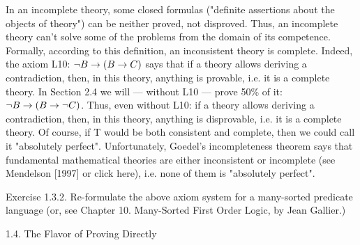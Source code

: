 In an incomplete theory, some closed formulas ("definite assertions about the objects of theory") can be
neither proved, not disproved. Thus, an incomplete theory can't solve some of the problems from the
domain of its competence.
Formally, according to this definition, an inconsistent theory is complete. Indeed, the axiom L10:
\(\neg B\rightarrow (B\rightarrow C)\) says that if a theory allows deriving a contradiction, then, in this theory, anything is
provable, i.e. it is a complete theory. In Section 2.4 we will --- without L10 --- prove 50\% of it:
\(\neg B\rightarrow (B\rightarrow \neg C)\). Thus, even without L10: if a theory allows deriving a contradiction, then, in this theory,
anything is disprovable, i.e. it is a complete theory.
Of course, if T would be both consistent and complete, then we could call it "absolutely perfect".
Unfortunately, Goedel's incompleteness theorem says that fundamental mathematical theories are
either inconsistent or incomplete (see Mendelson [1997] or click here), i.e. none of them is "absolutely
perfect".

Exercise 1.3.2. Re-formulate the above axiom system for a many-sorted predicate language (or, see Chapter 10. Many-Sorted First Order Logic, by Jean Gallier.)

1.4. The Flavor of Proving Directly

